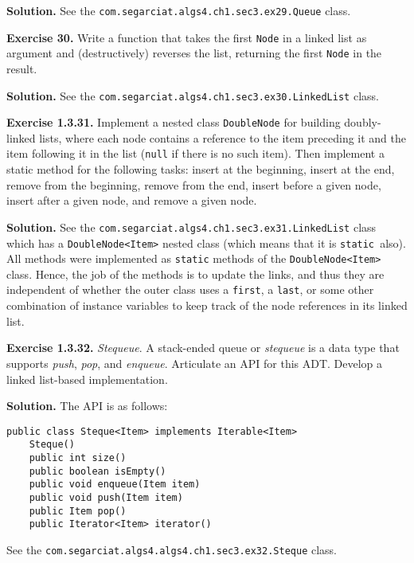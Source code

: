 \documentclass[12pt, a4paper]{article}
\newenvironment{ex}[2][Exercise]
{\par\medskip\noindent \textbf{#1 #2.}}
{\medskip}
\newenvironment{sol}[1][Solution]
{\par\medskip\noindent \textbf{#1.} }
{\medskip}
\begin{document}
	\begin{sol}
		See the \texttt{com.segarciat.algs4.ch1.sec3.ex29.Queue} class.
	\end{sol}
	\begin{ex}{30}
		Write a function that takes the first \texttt{Node} in a linked list as argument and
		(destructively) reverses the list, returning the first \texttt{Node} in the result.
	\end{ex}
	\begin{sol}
		See the \texttt{com.segarciat.algs4.ch1.sec3.ex30.LinkedList} class.
	\end{sol}
	\begin{ex}{1.3.31}
		Implement a nested class \texttt{DoubleNode} for building doubly-linked lists, where
		each node contains a reference to the item preceding it and the item following it
		in the list (\texttt{null} if there is no such item). Then implement a static method
		for the following tasks: insert at the beginning, insert at the end, remove from the
		beginning, remove from the end, insert before a given node, insert after a given node,
		and remove a given node.
	\end{ex}
	\begin{sol}
		See the \texttt{com.segarciat.algs4.ch1.sec3.ex31.LinkedList} class which has
		a \texttt{DoubleNode<Item>} nested class (which means that it is \texttt{static }also).
		All methods were implemented as \texttt{static} methods of the \texttt{DoubleNode<Item>}
		class. Hence, the job of the methods is to update the links, and thus they are independent
		of whether the outer class uses a \texttt{first}, a \texttt{last}, or some other
		combination of instance variables to keep track of the node references in its linked list.
	\end{sol}
	\begin{ex}{1.3.32}
		\emph{Stequeue}. A stack-ended queue or \emph{stequeue} is a data type that supports \emph{push},
		\emph{pop}, and \emph{enqueue}. Articulate an API for this ADT. Develop a
		linked list-based implementation.
	\end{ex}
	\begin{sol}
		The API is as follows:
		\begin{lstlisting}[language={}]
public class Steque<Item> implements Iterable<Item>
	Steque()
	public int size()
	public boolean isEmpty()
	public void enqueue(Item item)
	public void push(Item item)
	public Item pop()
	public Iterator<Item> iterator()
		\end{lstlisting}
		See the \texttt{com.segarciat.algs4.algs4.ch1.sec3.ex32.Steque} class.
	\end{sol}
\end{document}
